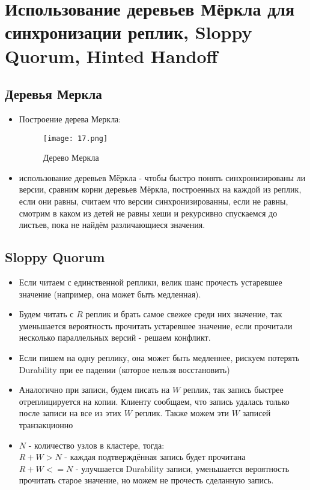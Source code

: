 \section{Использование деревьев Мёркла для синхронизации реплик, Sloppy Quorum, Hinted Handoff}
\subsection{Деревья Меркла}
\begin{itemize}
    \item Построение дерева Меркла:
    \begin{figure}[h]
        \centering
        \texttt{[image: 17.png]}
        \caption{Дерево Меркла}
    \end{figure}
    \item использование деревьев Мёркла - чтобы быстро понять синхронизированы ли версии, сравним корни деревьев Мёркла, построенных на каждой из реплик, если они равны, считаем что версии синхронизированны, если не равны, смотрим в каком из детей не равны хеши и рекурсивно спускаемся до листьев, пока не найдём различающиеся значения.
\end{itemize}
  \subsection{Sloppy Quorum}
  \begin{itemize}
    \item Если читаем с единственной реплики, велик шанс прочесть устаревшее значение (например, она может быть медленная).
    \item Будем читать с $R$ реплик и брать самое свежее среди них значение, так уменьшается вероятность прочитать устаревшее значение, если прочитали несколько параллельных версий - решаем конфликт.
    \item Если пишем на одну реплику, она может быть медленнее, рискуем потерять Durability при ее падении (которое нельзя восстановить)
    \item Аналогично при записи, будем писать на $W$ реплик, так запись быстрее отреплицируется на копии. Клиенту сообщаем, что запись удалась только после записи на все из этих $W$ реплик. Также можем эти $W$ записей транзакционно \\
    \item $N$ - количество узлов в кластере, тогда: \\
        $R + W > N$ - каждая подтверждённая запись будет прочитана \\
        $R + W <= N$ - улучшается Durability записи, уменьшается вероятность прочитать старое значение, но можем не прочесть сделанную запись.
  \end{itemize}
